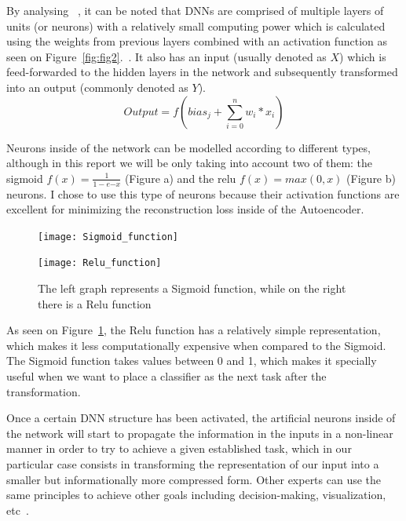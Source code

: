 By analysing ~, it can be noted that DNNs are comprised of multiple layers of units (or neurons) with a relatively small computing power which is calculated using the weights from previous layers combined with an activation function as seen on Figure~\ref{fig:fig2}.~. It also has an input (usually denoted as $X$) which is feed-forwarded to the hidden layers in the network and subsequently transformed into an output (commonly denoted as $Y$). 
%
\begin{equation}
\label{eq:artificial neuron}
Output = f( bias_j + \sum_{i = 0}^{n} w_{i}*x_i ) 
\end{equation}



Neurons inside of the network can be modelled  according to different types, although in this report we will be only taking into account two of them: the sigmoid $f(x) = \frac{1}{1 - e{-x}}$ (Figure a) and the relu $f(x) = max(0,x)$ (Figure b) neurons. I chose to use this type of neurons because their activation functions are excellent for minimizing the reconstruction loss inside of the Autoencoder. \newline
%
\begin{figure}[H]
	\begin{minipage}{.5\textwidth}
		\texttt{[image: Sigmoid\_function]}
	\end{minipage}%
	\begin{minipage}{.5\textwidth}
		\begin{flushright}
			\texttt{[image: Relu\_function]}  
		\end{flushright} 
	\end{minipage}  
	\caption{The left graph represents a Sigmoid function, while on the right there is a Relu function}
	\label{fig:fig3}
\end{figure}

As seen on Figure~\ref{fig:fig3}, the Relu function has a relatively simple representation, which makes it less computationally expensive when compared to the Sigmoid. The Sigmoid function takes values between 0 and 1, which makes it specially useful when we want to place a classifier as the next task after the transformation.\par 

Once a certain DNN structure has been activated, the artificial neurons inside of the network will start to propagate the information in the inputs in a non-linear manner in order to try to achieve a given established task, which in our particular case consists in transforming the representation of our input into a smaller but informationally more compressed form. Other experts can use the same principles to achieve other goals including decision-making, visualization, etc~\cite{this-needs-a-citation}.\par

